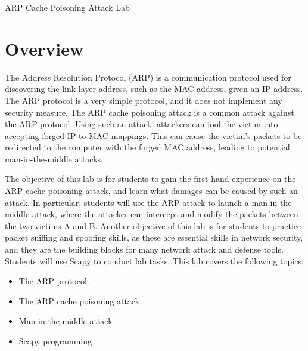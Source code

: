 



\newcommand{\arpFigs}{./Figs}






\begin{center}
{\LARGE ARP Cache Poisoning Attack Lab}
\end{center}




\section{Overview}


The Address Resolution Protocol (ARP) is a communication protocol used for discovering the link
layer address, such as the MAC address, given an IP address. The ARP protocol is a very simple
protocol, and it does not implement any security measure. 
The ARP cache poisoning attack is a common attack against the ARP protocol. 
Using such an attack, attackers can fool the victim into accepting
forged IP-to-MAC mappings. This can cause the victim's packets to be 
redirected to the computer with the forged MAC address, leading to
potential man-in-the-middle attacks.


The objective of this lab is for students to gain the first-hand experience on the ARP cache
poisoning attack, and learn what damages can be caused by such an attack.
In particular, students will use the ARP attack to launch a man-in-the-middle attack,  
where the attacker can intercept and modify the packets between the two victims A and B. 
Another objective of this lab is for students to practice 
packet sniffing and spoofing skills, as these are 
essential skills in network security, and they are the building blocks
for many network attack and defense tools. 
Students will use Scapy to conduct lab tasks. 
This lab covers the following topics:


\begin{itemize}[noitemsep]
\item The ARP protocol
\item The ARP cache poisoning attack
\item Man-in-the-middle attack
\item Scapy programming
\end{itemize}
 


